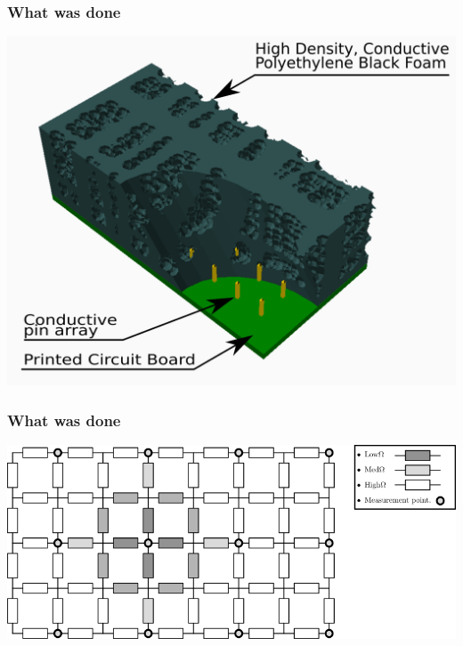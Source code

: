 \documentclass{beamer}
\begin{document}
\begin{frame}
    \frametitle{What was done}
    \begin{center}
        \includegraphics[width=.8\textwidth]{img/sensor_with_arrows_and_text.png}
    \end{center}
\end{frame}

\begin{frame}
    \frametitle{What was done}
    \begin{center}
        \includegraphics[width=.8\textwidth]{img/resistor_mapp_modell.png}
    \end{center}
\end{frame}
\end{document}
